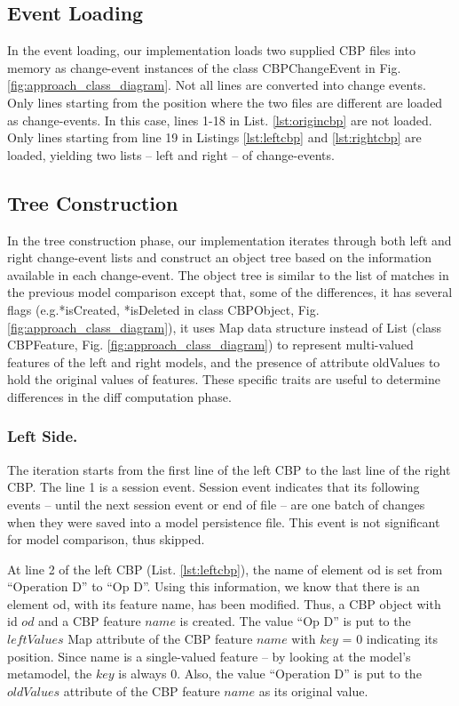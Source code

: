 \documentclass{llncs}
\begin{document}
\subsection{Event Loading}
\label{sec:event_loading}
In the event loading, our implementation loads two supplied CBP files into memory as change-event instances of the class \textsf{CBPChangeEvent} in Fig. \ref{fig:approach_class_diagram}. Not all lines are converted into change events. Only lines starting from the position where the two files are different are loaded as change-events. In this case, lines 1-18 in List. \ref{lst:origincbp} are not loaded. Only lines starting from line 19 in Listings \ref{lst:leftcbp} and \ref{lst:rightcbp} are loaded, yielding two lists -- left and right -- of change-events. 

\subsection{Tree Construction}
\label{sec:tree_construction}
In the tree construction phase, our implementation iterates through both left and right change-event lists and construct an object tree based on the information available in each change-event. The object tree is similar to the list of matches in the previous model comparison except that, some of the differences, it has several flags (e.g.\textsf{*isCreated}, \textsf{*isDeleted} in class \textsf{CBPObject}, Fig. \ref{fig:approach_class_diagram}), it uses Map data structure instead of List (class \textsf{CBPFeature}, Fig. \ref{fig:approach_class_diagram}) to represent multi-valued features of the left and right models, and the presence of attribute \textsf{oldValues} to hold the original values of features. These specific traits are useful to determine differences in the diff computation phase.

\subsubsection{Left Side.}\label{sec:left_side} The iteration starts from the first line of the left CBP to the last line of the right CBP. The line 1 is a session event. Session event indicates that its following events -- until the next session event or end of file -- are one batch of changes when they were saved into a model persistence file. This event is not significant for model comparison, thus skipped.  



At line 2 of the left CBP (List. \ref{lst:leftcbp}), the \textsf{name} of element \textsf{od} is set from ``Operation D'' to ``Op D''. Using this information, we know that there is an element \textsf{od}, with its feature \textsf{name}, has been modified. Thus, a CBP object with id $od$ and a CBP feature $name$ is created. The value ``Op D'' is put to the $leftValues$ Map attribute of the CBP feature $name$ with $key$ = 0 indicating its position. Since \textsf{name} is a single-valued feature -- by looking at the model's metamodel, the $key$ is always 0. Also, the value ``Operation D'' is put to the $oldValues$ attribute of the CBP feature $name$ as its original value. 
\end{document}
